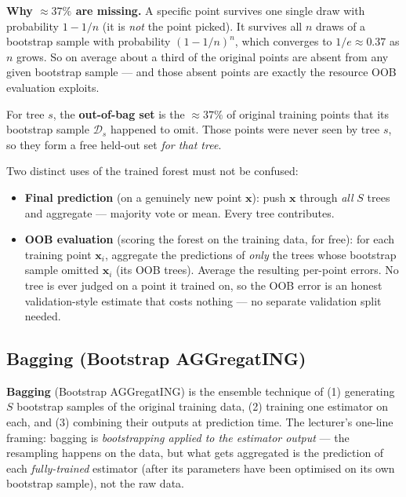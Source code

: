 \documentclass[11pt, a4paper]{article}
\begin{document}
\textbf{Why $\approx 37\%$ are missing.} A specific point survives one single draw with probability $1 - 1/n$ (it is \emph{not} the point picked). It survives all $n$ draws of a bootstrap sample with probability $(1 - 1/n)^n$, which converges to $1/e \approx 0.37$ as $n$ grows. So on average about a third of the original points are absent from any given bootstrap sample — and those absent points are exactly the resource OOB evaluation exploits.

\begin{defbox}
For tree $s$, the \textbf{out-of-bag set} is the $\approx 37\%$ of original training points that its bootstrap sample $\mathcal{D}_s$ happened to omit. Those points were never seen by tree $s$, so they form a free held-out set \emph{for that tree}.

Two distinct uses of the trained forest must not be confused:
\begin{itemize}
  \item \textbf{Final prediction} (on a genuinely new point $\mathbf{x}$): push $\mathbf{x}$ through \emph{all} $S$ trees and aggregate — majority vote or mean. Every tree contributes.
  \item \textbf{OOB evaluation} (scoring the forest on the training data, for free): for each training point $\mathbf{x}_i$, aggregate the predictions of \emph{only} the trees whose bootstrap sample omitted $\mathbf{x}_i$ (its OOB trees). Average the resulting per-point errors. No tree is ever judged on a point it trained on, so the OOB error is an honest validation-style estimate that costs nothing — no separate validation split needed.
\end{itemize}
\end{defbox}

\subsection{Bagging (Bootstrap AGGregatING)}

\begin{defbox}[Bagging]
\textbf{Bagging} (Bootstrap AGGregatING) is the ensemble technique of (1) generating $S$ bootstrap samples of the original training data, (2) training one estimator on each, and (3) combining their outputs at prediction time. The lecturer's one-line framing: bagging is \emph{bootstrapping applied to the estimator output} — the resampling happens on the data, but what gets aggregated is the prediction of each \emph{fully-trained} estimator (after its parameters have been optimised on its own bootstrap sample), not the raw data.
\end{defbox}
\end{document}
